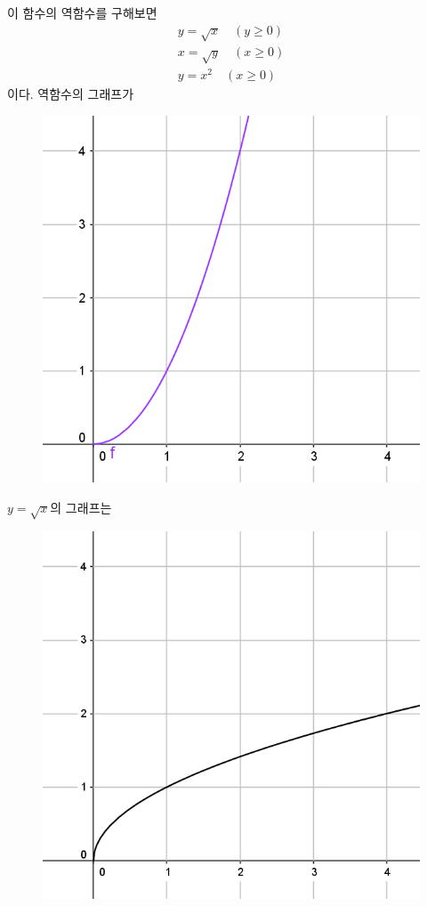 \documentclass{article}
\begin{document}
이 함수의 역함수를 구해보면
\begin{gather*}
y=\sqrt x\quad(y\ge0)\\
x=\sqrt y\quad(x\ge0)\\
y=x^2\quad(x\ge0)
\end{gather*}
이다.
역함수의 그래프가
\begin{figure}[h!]
\centering
\includegraphics{irr_1_1}
\end{figure}

\(y=\sqrt x\)의 그래프는
\begin{figure}[h!]
\centering
\includegraphics{irr_1_2}
\end{figure}
\end{document}
